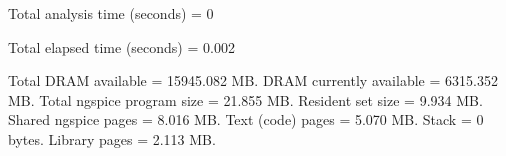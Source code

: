 Total analysis time (seconds) = 0

Total elapsed time (seconds) = 0.002 

Total DRAM available = 15945.082 MB.
DRAM currently available = 6315.352 MB.
Total ngspice program size =   21.855 MB.
Resident set size =    9.934 MB.
Shared ngspice pages =    8.016 MB.
Text (code) pages =    5.070 MB.
Stack = 0 bytes.
Library pages =    2.113 MB.

